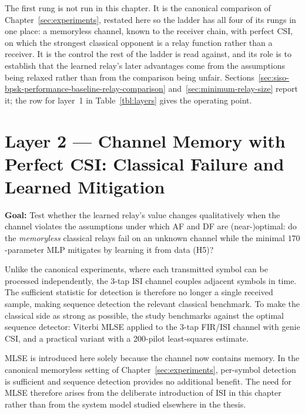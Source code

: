 The first rung is not run in this chapter. It is the canonical comparison of Chapter~\ref{sec:experiments}, restated here so the ladder has all four of its rungs in one place: a memoryless channel, known to the receiver chain, with perfect CSI, on which the strongest classical opponent is a relay function rather than a receiver. It is the control the rest of the ladder is read against, and its role is to establish that the learned relay's later advantages come from the assumptions being relaxed rather than from the comparison being unfair. Sections~\ref{sec:siso-bpsk-performance-baseline-relay-comparison} and~\ref{sec:minimum-relay-size} report it; the row for layer~1 in Table~\ref{tbl:layers} gives the operating point.

\section{Layer 2 --- Channel Memory with Perfect CSI: Classical Failure and Learned Mitigation}\label{sec:unknown-channel-experiment}

\textbf{Goal:} Test whether the learned relay's value changes qualitatively when the channel violates the assumptions under which AF and DF are (near-)optimal: do the \emph{memoryless} classical relays fail on an unknown channel while the minimal $170$-parameter MLP mitigates by learning it from data (H5)?

Unlike the canonical experiments, where each transmitted symbol can be processed independently, the 3-tap ISI channel couples adjacent symbols in time. The sufficient statistic for detection is therefore no longer a single received sample, making sequence detection the relevant classical benchmark. To make the classical side as strong as possible, the study benchmarks against the optimal sequence detector: Viterbi MLSE applied to the 3-tap FIR/ISI channel \cite{Forney1972MLSE} with genie CSI, and a practical variant with a 200-pilot least-squares estimate.

MLSE is introduced here solely because the channel now contains memory. In the canonical memoryless setting of Chapter~\ref{sec:experiments}, per-symbol detection is sufficient and sequence detection provides no additional benefit. The need for MLSE therefore arises from the deliberate introduction of ISI in this chapter rather than from the system model studied elsewhere in the thesis.

